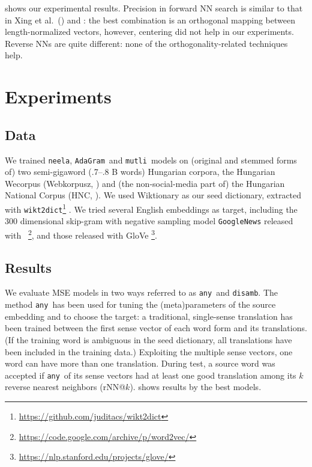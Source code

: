 \documentclass[11pt]{article}
\newcommand{\neelakantan}{\texttt{neela}}
\newcommand{\adagram}{\texttt{AdaGram}}
\newcommand{\mutli}{\texttt{mutli}}
\newcommand{\any}{\texttt{any}}
\newcommand{\disamb}{\texttt{disamb}}
\begin{document}
 shows our experimental results. Precision in forward NN
search is similar to that in Xing et al.~(\citeyear{Xing:2015}) and
\cite{Artetxe:2016}: the best combination is an orthogonal mapping between
length-normalized vectors, however, centering did not help in our experiments.
Reverse NNs are quite different: none of the orthogonality-related techniques
help. 

\section{Experiments}
\label{sec:exper}

\subsection{Data}

We trained \neelakantan, \adagram~and \mutli~models on (original and stemmed
forms of) two semi-gigaword (.7--.8 B words) Hungarian corpora, the Hungarian
Wecorpus (Webkorpusz, \cite{Halacsy:2004}) and (the non-social-media part of)
the Hungarian National Corpus (HNC, \cite{Oravecz:2014}).  We used Wiktionary
as our seed dictionary, extracted with
\texttt{wikt2dict}\footnote{\url{https://github.com/juditacs/wikt2dict}}
\citep{Acs:2013}. We tried several English embeddings as target, including the
300 dimensional skip-gram with negative sampling model \texttt{GoogleNews}
released with
\wordtovec~\citep{Mikolov:2013f}\footnote{\url{https://code.google.com/archive/p/word2vec/}},
and those released with GloVe
\citep{Pennington:2014}\footnote{\url{https://nlp.stanford.edu/projects/glove/}}.

\subsection{Results}

\label{sec:res}


We evaluate MSE models in two ways referred to as \any~and \disamb.  The method
\any~has been used for tuning the (meta)parameters of the source embedding and
to choose the target: a traditional, single-sense translation has been trained
between the first  sense vector of each word form and its
translations. (If the training word is ambiguous in the seed dictionary, all
translations have been included in the training data.)  Exploiting the multiple
sense vectors, one word can have more than one translation.  During test, a
source word was accepted if \any~of its sense vectors had at
least one good translation among its $k$ reverse nearest neighbors (rNN@$k$).
 shows results by the best models.
\end{document}
